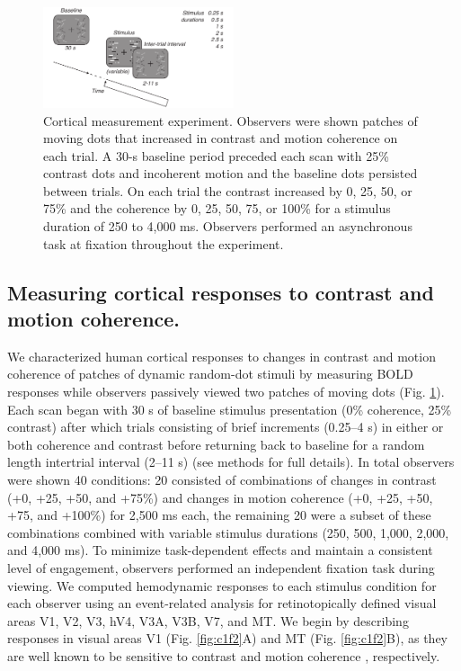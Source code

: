 \documentclass{report}
\begin{document}
\begin{figure}[ht]
\centering
\includegraphics[keepaspectratio,width=0.5\textwidth]{figs_c1/Fig1_task.pdf}
\caption[Cortical measurement experiment.]{Cortical measurement experiment. Observers were shown patches of moving dots that increased in contrast and motion coherence on each trial. A 30-s baseline period preceded each scan with 25\% contrast dots and incoherent motion and the baseline dots persisted between trials. On each trial the contrast increased by 0, 25, 50, or 75\% and the coherence by 0, 25, 50, 75, or 100\% for a stimulus duration of 250 to 4,000 ms. Observers performed an asynchronous task at fixation throughout the experiment.}
\label{fig:c1f1}
\end{figure}

\subsection{Measuring cortical responses to contrast and motion coherence.}

We characterized human cortical responses to changes in contrast and motion coherence of patches of dynamic random-dot stimuli by measuring BOLD responses while observers passively viewed two patches of moving dots (Fig. \ref{fig:c1f1}). Each scan began with 30 s of baseline stimulus presentation (0\% coherence, 25\% contrast) after which trials consisting of brief increments (0.25–4 s) in either or both coherence and contrast before returning back to baseline for a random length intertrial interval (2–11 s) (see methods for full details). In total observers were shown 40 conditions: 20 consisted of combinations of changes in contrast (+0, +25, +50, and +75\%) and changes in motion coherence (+0, +25, +50, +75, and +100\%) for 2,500 ms each, the remaining 20 were a subset of these combinations combined with variable stimulus durations (250, 500, 1,000, 2,000, and 4,000 ms). To minimize task-dependent effects and maintain a consistent level of engagement, observers performed an independent fixation task during viewing. We computed hemodynamic responses to each stimulus condition for each observer using an event-related analysis for retinotopically defined visual areas V1, V2, V3, hV4, V3A, V3B, V7, and MT. We begin by describing responses in visual areas V1 (Fig. \ref{fig:c1f2}A) and MT (Fig. \ref{fig:c1f2}B), as they are well known to be sensitive to contrast \citep{Avidan2002-jg,Boynton1996-ff,Gardner2005-pg,Logothetis2001-kk,Olman2004-dd,Tootell1995-gq,Tootell1998-mr} and motion coherence \citep{Britten1993-oh,Handel2007-xk,Rees2000-ul,Simoncelli1998-ts}, respectively.
\end{document}
